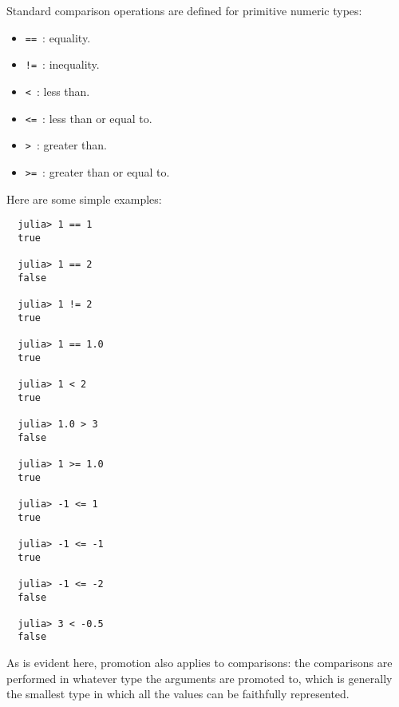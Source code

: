 \documentclass{article}
\begin{document}
Standard comparison operations are defined for primitive numeric types:
\begin{itemize}
  \item \verb|==|~: equality.
  \item \verb|!=|~: inequality.
  \item \verb|<|~: less than.
  \item \verb|<=|~: less than or equal to.
  \item \verb|>|~: greater than.
  \item \verb|>=|~: greater than or equal to.
\end{itemize}
Here are some simple examples:
\begin{verbatim}
  julia> 1 == 1
  true

  julia> 1 == 2
  false

  julia> 1 != 2
  true
  
  julia> 1 == 1.0
  true

  julia> 1 < 2
  true

  julia> 1.0 > 3
  false

  julia> 1 >= 1.0
  true

  julia> -1 <= 1
  true

  julia> -1 <= -1
  true

  julia> -1 <= -2
  false

  julia> 3 < -0.5
  false
\end{verbatim}
As is evident here, promotion also applies to comparisons:
the comparisons are performed in whatever type the arguments are promoted to, which is generally the smallest type in which all the values can be faithfully represented.
\end{document}
